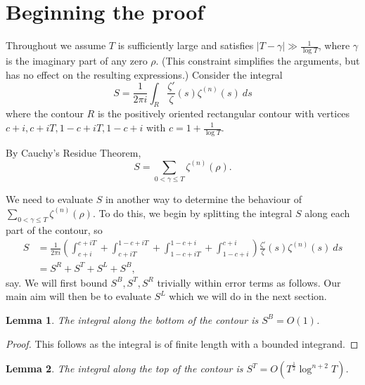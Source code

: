 \documentclass[12pt,a4paper,reqno]{amsart}
\newtheorem{lemma}{Lemma}
\theoremstyle{remark}
\numberwithin{equation}{section}
\begin{document}
\section{Beginning the proof}\label{sect:beginProof}


Throughout we assume $T$ is sufficiently large and satisfies $|T-\gamma| \gg \frac{1}{\log T}$, where $\gamma$ is the imaginary part of any zero $\rho$. (This constraint simplifies the arguments, but has no effect on the resulting expressions.) Consider the integral
\begin{equation}
S= \frac{1}{2 \pi i} \int_R \frac{\zeta '}{\zeta}(s) \zeta ^{(n)} (s) \ ds \label{eq:S}
\end{equation}
where the contour $R$ is the positively oriented rectangular contour with vertices $c+i, c+iT, 1-c+iT, 1-c+i$ with $c=1 + \frac{1}{\log T}$.


By Cauchy's Residue Theorem,
\[
S= \sum_{0 < \gamma \leq T} \zeta ^{(n)} (\rho).
\]

We need to evaluate $S$ in another way to determine the behaviour of $\sum_{0 < \gamma \leq T} \zeta ^{(n)} (\rho)$. To do this, we begin by splitting the integral $S$ along each part of the contour, so
\begin{align*}
S &= \frac{1}{2 \pi i} \left( \int_{c+i}^{c+iT} + \int_{c+iT}^{1-c+iT} + \int_{1-c+iT}^{1-c+i} + \int_{1-c+i}^{c+i} \right) \frac{\zeta '}{\zeta}(s) \zeta ^{(n)} (s) \ ds \\
&= S^R + S^T + S^L + S^B,
\end{align*}
say. We will first bound $S^B, S^T, S^R$ trivially within error terms as follows. Our main aim will then be to evaluate $S^L$ which we will do in the next section.


\begin{lemma}
The integral along the bottom of the contour is $S^B = O(1)$.
\end{lemma}

\begin{proof}
This follows as the integral is of finite length with a bounded integrand.
\end{proof}

\begin{lemma} \label{main S^T 2}
The integral along the top of the contour is $S^T = O(T^{\frac{1}{2}} \log^{n+2} T)$.
\end{lemma}
\end{document}
